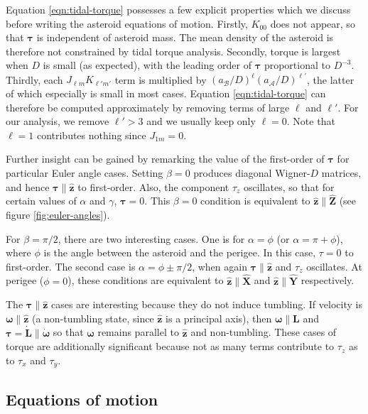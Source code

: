 \documentclass[fleqn,usenatbib]{mnras}
\newcommand{\unit}[1]{\bm{\hat{#1}}}
\begin{document}
Equation \ref{eqn:tidal-torque} possesses a few explicit properties which we discuss before writing the asteroid equations of motion. Firstly, $K_{00}$ does not appear, so that $\bm \tau$ is independent of asteroid mass. The mean density of the asteroid is therefore not constrained by tidal torque analysis. Secondly, torque is largest when $D$ is small (as expected), with the leading order of $\bm \tau$ proportional to $D^{-3}$. Thirdly, each $J_{\ell m}K_{\ell' m'}$ term is multiplied by $(a_\mathcal{B}/D)^\ell (a_\mathcal{A}/D)^{\ell'}$, the latter of which especially is small in most cases. Equation \ref{eqn:tidal-torque} can therefore be computed approximately by removing terms of large $\ell$ and $\ell'$. For our analysis, we remove $\ell' > 3$ and we usually keep only $\ell=0$. Note that $\ell=1$ contributes nothing since $J_{1m}=0$.

Further insight can be gained by remarking the value of the first-order of $\bm \tau$ for particular Euler angle cases. Setting $\beta = 0$ produces diagonal Wigner-$D$ matrices, and hence $\bm \tau \parallel \unit z$ to first-order. Also, the component $\tau_z$ oscillates, so that for certain values of $\alpha$ and $\gamma$, $\bm \tau = 0.$ This $\beta=0$ condition is equivalent to $\unit z \parallel \unit Z$ (see figure \ref{fig:euler-angles}).

For $\beta = \pi/2$, there are two interesting cases. One is for $\alpha = \phi$ (or $\alpha = \pi + \phi$), where $\phi$ is the angle between the asteroid and the perigee. In this case, $\tau = 0$ to first-order. The second case is $\alpha = \phi \pm \pi/2$, when again $\bm \tau \parallel \unit z$ and $\tau_z$ oscillates. At perigee ($\phi=0$), these conditions are equivalent to $\unit z \parallel \unit X$ and $\unit z \parallel \unit Y$ respectively.

The $\bm \tau \parallel \unit z$ cases are interesting because they do not induce tumbling. If velocity is $\bm \omega \parallel \unit z$ (a non-tumbling state, since $\unit z$ is a principal axis), then $\bm \omega \parallel \bm L$ and $\bm \tau = \dot{\bm L} \parallel \dot{\bm \omega}$ so that $\bm \omega$ remains parallel to $\unit z$ and non-tumbling. These cases of torque are additionally significant because not as many terms contribute to $\tau_z$ as to $\tau_x$ and $\tau_y$.

\subsection{Equations of motion}
\label{sec:eom}
\end{document}
